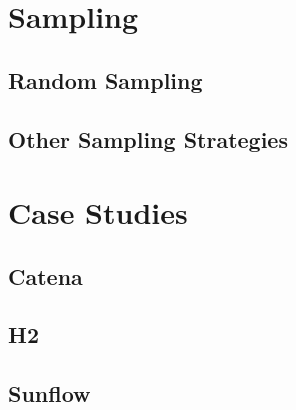 \section{Sampling}


\subsection{Random Sampling}


\subsection{Other Sampling Strategies}



\section{Case Studies}



\subsection{Catena}


\subsection{H2}


\subsection{Sunflow}

